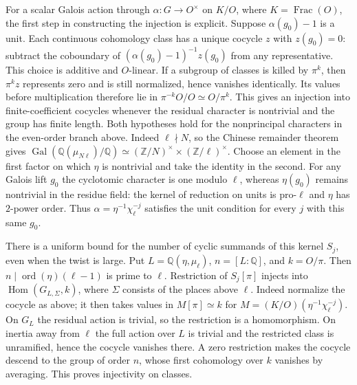 \documentclass[11pt]{amsart}
\theoremstyle{definition}
\theoremstyle{remark}
\begin{document}
For a scalar Galois action through $\alpha:G\to O^\times$ on
$K/O$, where $K=\operatorname{Frac}(O)$, the first step in constructing
the injection is explicit. Suppose $\alpha(g_0)-1$ is a unit.
Each continuous cohomology class has a unique cocycle $z$ with
$z(g_0)=0$: subtract the coboundary of
$(\alpha(g_0)-1)^{-1}z(g_0)$ from any representative. This choice
is additive and $O$-linear. If a subgroup of classes is killed by
$\pi^k$, then $\pi^k z$ represents zero and is still normalized,
hence vanishes identically. Its values before multiplication
therefore lie in $\pi^{-k}O/O\simeq O/\pi^k$. This gives an
injection into finite-coefficient cocycles whenever the residual
character is nontrivial and the group has finite length. Both hypotheses hold for the nonprincipal characters in the
even-order branch above. Indeed $\ell\nmid N$, so the Chinese
remainder theorem gives
$\operatorname{Gal}(\mathbb Q(\mu_{N\ell})/\mathbb Q)
\simeq (\mathbb Z/N)^\times\times(\mathbb Z/\ell)^\times$.
Choose an element in the first factor on which $\eta$ is nontrivial
and take the identity in the second. For any Galois lift $g_0$
the cyclotomic character is one modulo $\ell$, whereas
$\eta(g_0)$ remains nontrivial in the residue field: the kernel of
reduction on units is pro-$\ell$ and $\eta$ has $2$-power order.
Thus $\alpha=\eta^{-1}\chi_\ell^{-j}$ satisfies the unit condition
for every $j$ with this same $g_0$.

There is a uniform bound for the number of cyclic summands of this
kernel $S_j$, even when the twist is large. Put $L=\mathbb Q(\eta,\mu_\ell)$,
$n=[L:\mathbb Q]$, and $k=O/\pi$. Then $n\mid
\operatorname{ord}(\eta)(\ell-1)$ is prime to $\ell$. Restriction of
$S_j[\pi]$ injects into $\operatorname{Hom}(G_{L,\Sigma},k)$, where
$\Sigma$ consists of the places above $\ell$. Indeed normalize the
cocycle as above; it then takes values in $M[\pi]\simeq k$ for
$M=(K/O)(\eta^{-1}\chi_\ell^{-j})$. On $G_L$ the residual action
is trivial, so the restriction is a homomorphism. On inertia away
from $\ell$ the full action over $L$ is trivial and the restricted
class is unramified, hence the cocycle vanishes there. A zero
restriction makes the cocycle descend to the group of order $n$,
whose first cohomology over $k$ vanishes by averaging. This proves
injectivity on classes.
\end{document}
